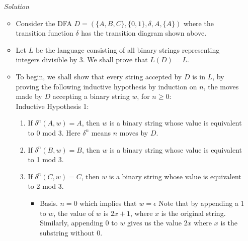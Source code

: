 \documentclass[]{article}
\begin{document}
\begin{enumerate}
    \item[\emph{Solution}]
      \begin{itemize}
        \item Consider the DFA $D = (\{A,B,C\}, \{0,1\}, \delta, A, \{A\})$ 
        where the transition function $\delta$ has the transition diagram shown
        above.
        \item Let $L$ be the language consisting of all binary strings 
        representing integers divisible by 3. We shall prove that $L(D) = L$.
        \item To begin, we shall show that every string accepted by $D$ is in $L
        $, by proving the following inductive hypothesis by induction on $n$, 
        the moves made by $D$ accepting a binary string $w$, for $n \geq 0$:
        \\ Inductive Hypothesis 1:
          \begin{enumerate}
            \item If $\delta^n(A,w) = A$, then $w$ is a binary string whose 
            value is equivalent to 0 mod 3. Here $\delta^n$ means $n$ moves by 
            $D$.
            \item If $\delta^n(B,w) = B$, then $w$ is a binary string whose 
            value is equivalent to 1 mod 3.
            \item If $\delta^n(C,w) = C$, then $w$ is a binary string whose 
            value is equivalent to 2 mod 3.
              \begin{itemize}
                \item Basis. $n = 0$ which implies that $w = \epsilon$ Note that 
                by appending a $1$ to $w$, the value of $w$ is $2x + 1$, where 
                $x$ is the original string. Similarly, appending $0$ to $w$ 
                gives us the value $2x$ where $x$ is the substring without $0$.

\end{itemize}
\end{enumerate}
\end{itemize}
\end{enumerate}
\end{document}
